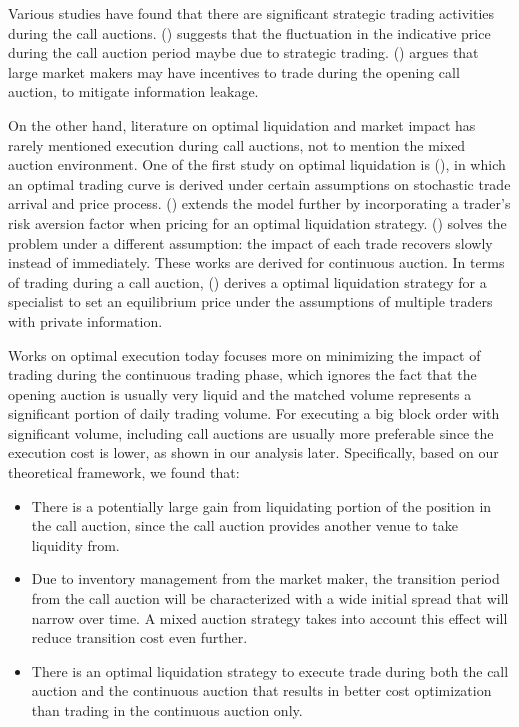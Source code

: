 \documentclass{article}
\begin{document}
Various studies have found that there are significant strategic trading activities during the call auctions. (\cite{Bruno1999}) suggests that the fluctuation in the indicative price during the call auction period maybe due to strategic trading. (\cite{Vives2001}) argues that large market makers may have incentives to trade during the opening call auction, to mitigate information leakage.

On the other hand, literature on optimal liquidation and market impact has rarely mentioned execution during call auctions, not to mention the mixed auction environment. One of the first study on optimal liquidation is (\cite{HoStoll1981}), in which an optimal trading curve is derived under certain assumptions on stochastic trade arrival and price process. (\cite{AlmgrenChriss2000}) extends the model further by incorporating a trader's risk aversion factor when pricing for an optimal liquidation strategy. (\cite{Obizhaeva2013}) solves the problem under a different assumption: the impact of each trade recovers slowly instead of immediately. These works are derived for continuous auction. In terms of trading during a call auction, (\cite{Madhavan2015}) derives a optimal liquidation strategy for a specialist to set an equilibrium price under the assumptions of multiple traders with private information.

Works on optimal execution today focuses more on minimizing the impact of trading during the continuous trading phase, which ignores the fact that the opening auction is usually very liquid and the matched volume represents a significant portion of daily trading volume. For executing a big block order with significant volume, including call auctions are usually more preferable since the execution cost is lower, as shown in our analysis later. Specifically, based on our theoretical framework, we found that:

\begin{itemize}
  \item There is a potentially large gain from liquidating portion of the position in the call auction, since the call auction provides another venue to take liquidity from.
  \item Due to inventory management from the market maker, the transition period from the call auction will be characterized with a wide initial spread that will narrow over time. A mixed auction strategy takes into account this effect will reduce transition cost even further.
  \item There is an optimal liquidation strategy to execute trade during both the call auction and the continuous auction that results in better cost optimization than trading in the continuous auction only.
\end{itemize}
\end{document}

